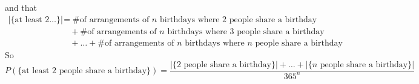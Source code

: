 \documentclass{article}
\begin{document}
and that
\begin{align*}
|\{\text{at least 2\ldots}\}|& =\text{\# of arrangements of $n$ birthdays where 2 people share a birthday}\\
& \quad+\text{\# of arrangements of $n$ birthdays where 3 people share a birthday}\\
& \quad+\ldots+\text{\# of arrangements of $n$ birthdays where $n$ people share a birthday}
\end{align*}
So
\begin{equation*}
P(\{\text{at least 2 people share a birthday}\})=\dfrac{|\{\text{2 people share a birthday}\}|+\ldots+|\{\text{$n$ people share a birthday}\}|}{365^n}
\end{equation*}
\end{document}
